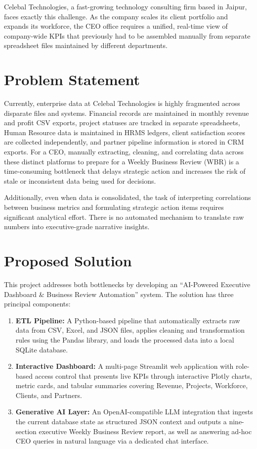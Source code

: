 \documentclass{book}
\begin{document}
\par\noindent
Celebal Technologies, a fast-growing technology consulting firm based in Jaipur, faces exactly this challenge. As the company scales its client portfolio and expands its workforce, the CEO office requires a unified, real-time view of company-wide KPIs that previously had to be assembled manually from separate spreadsheet files maintained by different departments.

\section{Problem Statement}
Currently, enterprise data at Celebal Technologies is highly fragmented across disparate files and systems. Financial records are maintained in monthly revenue and profit CSV exports, project statuses are tracked in separate spreadsheets, Human Resource data is maintained in HRMS ledgers, client satisfaction scores are collected independently, and partner pipeline information is stored in CRM exports. For a CEO, manually extracting, cleaning, and correlating data across these distinct platforms to prepare for a Weekly Business Review (WBR) is a time-consuming bottleneck that delays strategic action and increases the risk of stale or inconsistent data being used for decisions.

\par\noindent
Additionally, even when data is consolidated, the task of interpreting correlations between business metrics and formulating strategic action items requires significant analytical effort. There is no automated mechanism to translate raw numbers into executive-grade narrative insights.

\section{Proposed Solution}
This project addresses both bottlenecks by developing an ``AI-Powered Executive Dashboard \& Business Review Automation'' system. The solution has three principal components:

\begin{enumerate}
    \item \textbf{ETL Pipeline:} A Python-based pipeline that automatically extracts raw data from CSV, Excel, and JSON files, applies cleaning and transformation rules using the Pandas library, and loads the processed data into a local SQLite database.
    \item \textbf{Interactive Dashboard:} A multi-page Streamlit web application with role-based access control that presents live KPIs through interactive Plotly charts, metric cards, and tabular summaries covering Revenue, Projects, Workforce, Clients, and Partners.
    \item \textbf{Generative AI Layer:} An OpenAI-compatible LLM integration that ingests the current database state as structured JSON context and outputs a nine-section executive Weekly Business Review report, as well as answering ad-hoc CEO queries in natural language via a dedicated chat interface.
\end{enumerate}
\end{document}
